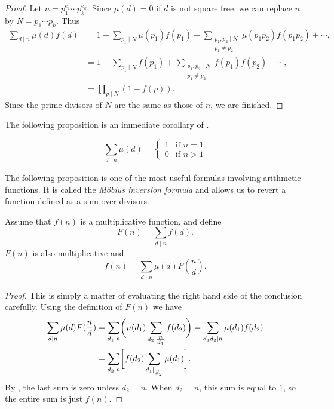 \begin{proof}
Let $n = p_1^{e_1} \cdots p_k^{e_k}$.  Since $\mu(d) = 0$ if $d$ is not
square free, we can replace $n$ by $N = p_1 \cdots p_k$.  Thus
\[
\begin{aligned}
  \sum_{d\mid n} \mu(d) f(d) & = 1 + \sum_{p_1\mid N} \mu(p_1) f(p_1) + 
  \sum_{\substack{p_1, p_2\mid N \\ p_1 \not=p_2}} \mu(p_1 p_2) f(p_1 p_2) +
      \cdots,\\
    & = 1 - \sum_{p_1\mid N} f(p_1) 
       + \sum_{\substack{p_1, p_2\mid N \\ p_1 \not=p_2}} f(p_1) f(p_2)
       + \cdots,\\
    & = \prod_{p\mid N} \left(1 - f(p)\right).
\end{aligned}
\]
Since the prime divisors of $N$ are the same as those of $n$, we are
finished. \end{proof}

The following proposition is an immediate corollary of
. 

\begin{proposition} \label{MobiusSum:Prop}
\[
\sum_{d\mid n} \mu(d) = 
  \begin{cases}
    1 & \text{if $n = 1$} \\
    0& \text{if $n > 1$}
  \end{cases}
\]
\end{proposition}

The following proposition is one of the most useful formulas
involving arithmetic functions.  It is called the {\em M\"obius
inversion formula} and allows us to revert a function defined as a sum over divisors.

\begin{proposition}
\label{Mobius:Prop}
Assume that $f(n)$ is a multiplicative function, and define
\begin{equation}\label{Moebius:Eq:a}
F(n) = \sum_{d\mid n} f(d).
\end{equation}
$F(n)$ is also multiplicative and 
\begin{equation}\label{Moebius:Eq:b}
f(n) = \sum_{d\mid n} \mu(d) F(\frac{n}{d}).
\end{equation}
\end{proposition}

\begin{proof}
This is simply a matter of evaluating the right hand side of the
conclusion carefully.  Using the definition of $F(n)$ we have
\[
\begin{aligned}
  \sum_{d\mid n} \mu(d) F(\frac{n}{d}) &=
      \sum_{d_1\mid n} \biggl( \mu(d_1) 
         \sum_{d_2\mid \frac{\scriptstyle n}{\scriptstyle d_1}} f(d_2) \biggr)
      = \sum_{d_1 d_2 \mid n} \mu(d_1) f(d_2) \\
    & = \sum_{d_2 \mid  n} \biggl[ f(d_2) 
      \sum_{d_1\mid \frac{\scriptstyle }{\scriptstyle d_2}} \mu(d_1)\biggr].
\end{aligned}
\]
By , the last sum is zero unless $d_2 = n$.
When $d_2 = n$, this sum is equal to $1$, so the entire sum is just
$f(n)$.
\end{proof}

